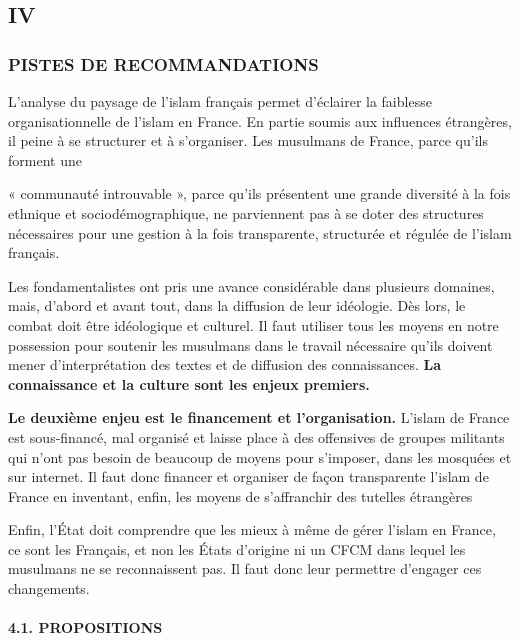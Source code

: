 \hypertarget{iv}{%
\subsection{IV}\label{iv}}

\hypertarget{pistes-de-recommandations}{%
\subsubsection{PISTES DE
RECOMMANDATIONS}\label{pistes-de-recommandations}}


L'analyse du paysage de l'islam français permet d'éclairer la faiblesse
organisationnelle de l'islam en France. En partie soumis aux influences
étrangères, il peine à se structurer et à s'organiser. Les musulmans de
France, parce qu'ils forment une

« communauté introuvable », parce qu'ils présentent une grande diversité
à la fois ethnique et sociodémographique, ne parviennent pas à se doter
des structures nécessaires pour une gestion à la fois transparente,
structurée et régulée de l'islam français.

Les fondamentalistes ont pris une avance considérable dans plusieurs
domaines, mais, d'abord et avant tout, dans la diffusion de leur
idéologie. Dès lors, le combat doit être idéologique et culturel. Il
faut utiliser tous les moyens en notre possession pour soutenir les
musulmans dans le travail nécessaire qu'ils doivent mener
d'interprétation des textes et de diffusion des connaissances.
\textbf{La connaissance et la culture sont les enjeux premiers.}

\textbf{Le deuxième enjeu est le financement et l'organisation.} L'islam
de France est sous-financé, mal organisé et laisse place à des
offensives de groupes militants qui n'ont pas besoin de beaucoup de
moyens pour s'imposer, dans les mosquées et sur internet. Il faut donc
financer et organiser de façon transparente l'islam de France en
inventant, enfin, les moyens de s'affranchir des tutelles étrangères

Enfin, l'État doit comprendre que les mieux à même de gérer l'islam en
France, ce sont les Français, et non les États d'origine ni un CFCM dans
lequel les musulmans ne se reconnaissent pas. Il faut donc leur
permettre d'engager ces changements.




\hypertarget{propositions}{%
\paragraph{4.1. PROPOSITIONS}\label{propositions}}

